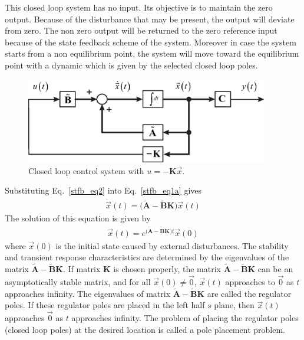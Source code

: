 \documentclass[11pt,a4paper,oneside]{book}
\numberwithin{equation}{section}
\theoremstyle{it}
\theoremstyle{definition}
\begin{document}
This closed loop system has no input. Its objective is to maintain the zero 
output. Because of the disturbance that may be present, the output will deviate 
from zero. The non zero output will be returned to the zero reference input 
because of the state feedback scheme of the system. Moreover in case the system 
starts from a non equilibrium point, the system will move toward the 
equilibrium point with a dynamic which is given by the selected closed loop 
poles.
\begin{figure}[H]
	\centering
	\includegraphics[width = 300pt, 
	keepaspectratio]{figures/state_fb/state_feedback.eps}
	\captionsetup{width=0.5\textwidth, font=small}
	\caption{Closed loop control system with $u=-\mathbf{K}\vec{x}$.}
	\label{state_feedback}
\end{figure}
Substituting Eq.~\eqref{stfb_eq2} into Eq.~\eqref{stfb_eq1a} gives
\begin{equation} \label{stfb_eq3}
	\begin{aligned}
		\dot{\vec{x}}(t)=\Big(\tilde{\mathbf{A}}-\tilde{\mathbf{B}} 
		\mathbf{K}\Big)\vec{x}(t)
	\end{aligned}
\end{equation}
The solution of this equation is given by
\begin{equation} \label{stfb_eq4}
	\begin{aligned}
		{\vec{x}}(t)=e^{\big(\tilde{\mathbf{A}}-\tilde{\mathbf{B}} 
			\mathbf{K}\big)t}{\vec{x}}(0)
	\end{aligned}
\end{equation}
where $\vec{x}(0)$ is the initial state caused by external disturbances. The 
stability and transient response characteristics are determined by the 
eigenvalues of the matrix $\tilde{\mathbf{A}}-\tilde{\mathbf{B}}\mathbf{K}$. If 
matrix $\mathbf{K}$ is chosen properly, the matrix $\tilde{\mathbf{A}}-\tilde{\mathbf{B}}\mathbf{K}$ can be an asymptotically stable matrix, and for all $\vec{x}(0)\ne\vec{0}$, $\vec{x}(t)$ approaches to $\vec{0}$ as $t$ approaches infinity. The eigenvalues of matrix 
$\tilde{\mathbf{A}}-\tilde{\mathbf{B}}\mathbf{K}$ are called  the regulator 
poles. If these regulator poles are placed in the left half $s$ plane, then $\vec{x}(t)$ approaches $\vec{0}$ as $t$ approaches infinity. The problem of placing the regulator poles (closed 
loop poles) at the desired location is called a pole placement problem.
\end{document}
